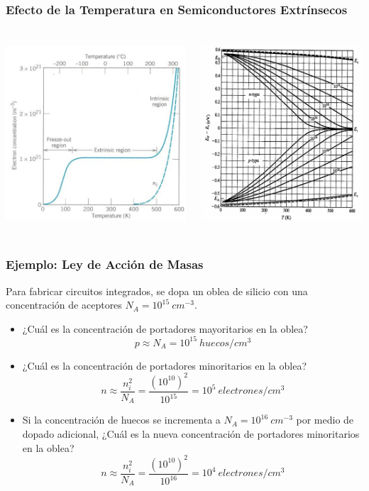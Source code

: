 \documentclass[10pt,t,aspectratio=169]{beamer}
\begin{document}
\begin{frame}[t]
  \frametitle{Efecto de la Temperatura en Semiconductores Extrínsecos}

  \begin{columns}
    \begin{column}{0.5\textwidth}
      \centering
      \includegraphics[height=7cm]{./figures/temp1.jpg}
    \end{column}
    \begin{column}{0.5\textwidth}
      \centering
      \includegraphics[height=7cm]{./figures/temp2.png}
    \end{column}
  \end{columns}
\end{frame}


\begin{frame}[t]
  \frametitle{Ejemplo: Ley de Acción de Masas}

  Para fabricar circuitos integrados, se dopa un oblea de silicio con una concentración de aceptores $N_A=10^{15}\ cm^{-3}$.
 
  \begin{itemize}
    \item ¿Cuál es la concentración de portadores mayoritarios en la oblea?
    \[ p \approx N_A = 10^{15}\ huecos/cm^3 \]
    \item ¿Cuál es la concentración de portadores minoritarios en la oblea?
    \[ n \approx \dfrac{n_i^2}{N_A} = \dfrac{(10^{10})^2}{10^{15}} = 10^5\ electrones/cm^3 \]
    \item Si la concentración de huecos se incrementa a $N_A=10^{16}\ cm^{-3}$ por medio de dopado adicional, ¿Cuál es la nueva concentración de portadores minoritarios en la oblea?
    \[ n \approx \dfrac{n_i^2}{N_A} = \dfrac{(10^{10})^2}{10^{16}} = 10^4\ electrones/cm^3 \]
  \end{itemize}
\end{frame}
\end{document}
